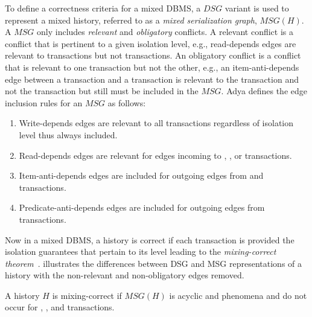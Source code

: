 To define a correctness criteria for a mixed DBMS, a $DSG$ variant is used to represent a 
mixed history, referred to as a \textit{mixed serialization graph}, $MSG(H)$. A $MSG$ only includes 
\textit{relevant} and \textit{obligatory} conflicts. A relevant conflict is a conflict that is pertinent to a 
given isolation level, e.g., read-depends edges are relevant to  transactions but not 
 transactions. An obligatory conflict is a conflict that is relevant to one transaction 
but not the other, e.g., an item-anti-depends edge between a  transaction and a 
 transaction is relevant to the  transaction and not the  transaction but still must be included in the $MSG$. Adya defines the edge inclusion rules for an 
$MSG$ as follows:
\begin{enumerate}
\item Write-depends edges are relevant to all transactions regardless of isolation level
  thus always included.
\item Read-depends edges are relevant for edges incoming to ,
  , or  transactions.
\item Item-anti-depends edges are included for outgoing edges from  and
   transactions.
\item Predicate-anti-depends edges are included for outgoing edges from 
  transactions.
\end{enumerate}
Now in a mixed DBMS, a history is correct if each transaction is provided the isolation guarantees that pertain 
to its level leading to the \emph{mixing-correct theorem}~\cite{adya1999weak}.  illustrates the differences between 
DSG and MSG representations of a history with the non-relevant and non-obligatory edges removed. 

\begin{theorem}
  A history $H$ is mixing-correct if $MSG(H)$ is acyclic and phenomena  and
   do not occur for , , and  transactions.
\end{theorem}




